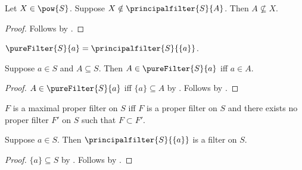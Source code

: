 \begin{proposition}\label{principalfilter_notelem_implies_notsupseteq}
    Let $X\in\pow{S}$.
    Suppose $X\notin\principalfilter{S}{A}$.
    Then $A\not\subseteq X$.
\end{proposition}
\begin{proof}
    Follows by .
\end{proof}

\begin{definition}\label{pure_filter}
    $\pureFilter{S}{a}=\principalfilter{S}{\{a\}}$.
\end{definition}

\begin{proposition}\label{pure_filter_iff}
    Suppose $a\in S$ and $A\subseteq S$.
    Then $A\in\pureFilter{S}{a}$ iff $a\in A$.
\end{proposition}
\begin{proof}
    $A\in\pureFilter{S}{a}$ iff $\{a\}\subseteq A$ by
        .
    Follows by .
\end{proof}

\begin{definition}\label{maximalfilter}
    $F$ is a maximal proper filter on $S$ iff
    $F$ is a proper filter on $S$ and there exists no proper filter $F'$ on $S$ such that $F\subset F'$.
\end{definition}

\begin{proposition}\label{principalfilter_singleton_is_filter}
    Suppose $a\in S$.
    Then $\principalfilter{S}{\{a\}}$ is a filter on $S$.
\end{proposition}
\begin{proof}
    $\{a\}\subseteq S$ by .
    Follows by .
\end{proof}

